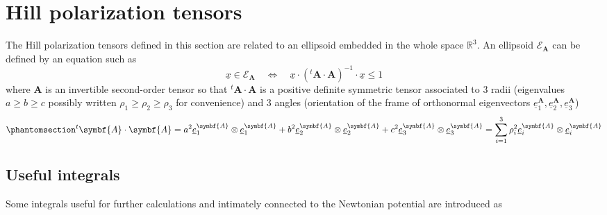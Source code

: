 \documentclass[
  a4paper,
  numbers=noendperiod,
  DIV=12]{scrreprt}
\newcommand{\R}{{\mathbb{{R}}}}
\newcommand{\uu}[1]{{\symbf{{#1}}}}
\newcommand{\uv}[1]{{\underline{{#1}}}}
\newcommand{\trans}[1]{{{}^{t}{#1}}}
\begin{document}
\chapter{Hill polarization tensors}\label{sec-hill_elas}

The Hill polarization tensors defined in this section are related to an
ellipsoid embedded in the whole space \(\R^3\). An ellipsoid
\(\mathcal{E}_{\uu{A}}\) can be defined by an equation such as \[
\uv{x}\in\mathcal{E}_{\uu{A}}
\quad\Leftrightarrow\quad
\uv{x}\cdot(\trans{\uu{A}}\cdot\uu{A})^{-1}\cdot\uv{x}\leq 1
\] where \(\uu{A}\) is an invertible second-order tensor so that
\(\trans{\uu{A}}\cdot\uu{A}\) is a positive definite symmetric tensor
associated to 3 radii (eigenvalues \(a\geq b \geq c\) possibly written
\(\rho_1 \geq \rho_2 \geq \rho_3\) for convenience) and 3 angles
(orientation of the frame of orthonormal eigenvectors
\(\uv{e}^{\uu{A}}_1, \uv{e}^{\uu{A}}_2, \uv{e}^{\uu{A}}_3\))
\begin{equation}\protect\phantomsection\label{eq-ellipsoid}{
\trans{\uu{A}}\cdot\uu{A}=a^2 \uv{e}^{\uu{A}}_1\otimes\uv{e}^{\uu{A}}_1 + b^2 \uv{e}^{\uu{A}}_2\otimes\uv{e}^{\uu{A}}_2 + c^2 \uv{e}^{\uu{A}}_3\otimes\uv{e}^{\uu{A}}_3 = \sum_{i=1}^3 \rho_i^2 \uv{e}^{\uu{A}}_i\otimes\uv{e}^{\uu{A}}_i
}\end{equation}

\section{Useful integrals}\label{useful-integrals}

Some integrals useful for further calculations and intimately connected
to the Newtonian potential are introduced as
\end{document}
